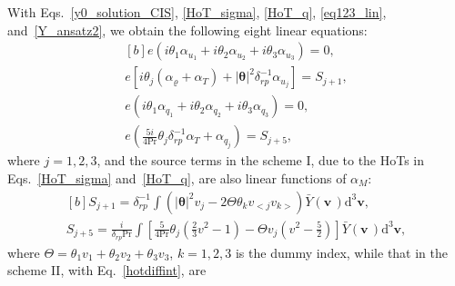 With Eqs.~\eqref{y0_solution_CIS},  \eqref{HoT_sigma}, \eqref{HoT_q}, \eqref{eq123_lin}, and~\eqref{Y_ansatz2}, we obtain the following eight linear equations: 
\begin{equation}\label{L_lin1}
\begin{aligned}[b]
e(i\theta_1\alpha_{u_1}+i\theta_2\alpha_{u_2}+i\theta_3\alpha_{u_3})=0, \\
e[i\theta_j(\alpha_\varrho+\alpha_T)+|\bm{\theta}|^2{\delta^{-1}_{rp}}\alpha_{u_j}]=S_{j+1},\\
e(i\theta_1\alpha_{q_1}+i\theta_2\alpha_{q_2}+i\theta_3\alpha_{q_3})=0,\\
e\left(\frac{5i}{4\text{Pr}}\theta_j{\delta^{-1}_{rp}}\alpha_{T}+\alpha_{q_j}\right)=S_{j+5},
\end{aligned}
\end{equation}
where $j=1,2,3$, and the source terms in the scheme I, due to the HoTs in Eqs.~\eqref{HoT_sigma} and~\eqref{HoT_q}, are also linear functions of $\alpha_M$:
\begin{equation}\label{L_lin2}
\begin{aligned}[b]
S_{j+1}=\delta^{-1}_{rp}\int\left(|\bm{\theta}|^2{v}_j-2\Theta
\theta_kv_{<j}v_{k>}\right)\bar{Y}(\bm{{v}}\,)\mathrm{d}^3\bm{{v}}, \\
S_{j+5}=\frac{i}{\delta_{rp}\text{Pr}}\int\left[\frac{5}{4\text{Pr}}\theta_j\left(\frac{2}{3}{v}^2-1\right)-\Theta{v}_j\left({v}^2-\frac{5}{2}\right)\right]\bar{Y}(\bm{{v}}\,)\mathrm{d}^3\bm{{v}},
\end{aligned} 
\end{equation} 
where $\Theta=\theta_1{v}_1+\theta_2v_2+\theta_3v_3$, $k=1,2,3$ is the dummy index, while that in the scheme II, with Eq.~\eqref{hotdiffint}, are
